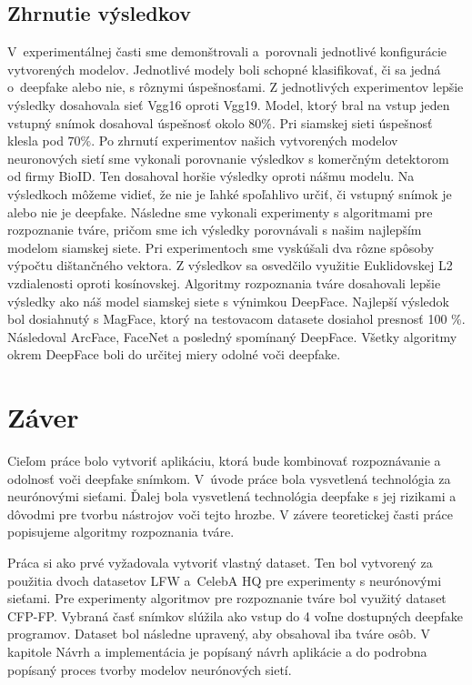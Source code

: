 \newpage

\section{Zhrnutie výsledkov}
V~experimentálnej časti sme demonštrovali a~porovnali jednotlivé konfigurácie vytvorených modelov. Jednotlivé modely boli schopné klasifikovať, či sa jedná o~deepfake alebo nie, s rôznymi úspešnosťami. Z jednotlivých experimentov lepšie výsledky dosahovala sieť Vgg16 oproti Vgg19. Model, ktorý bral na vstup jeden vstupný snímok dosahoval úspešnosť okolo $80 \%$. Pri siamskej sieti úspešnosť klesla pod $70 \%$. Po zhrnutí experimentov našich vytvorených modelov neuronových sietí sme vykonali porovnanie výsledkov s komerčným detektorom od firmy BioID. Ten dosahoval horšie výsledky oproti nášmu modelu. Na výsledkoch môžeme vidieť, že nie je ľahké spoľahlivo určiť, či vstupný snímok je alebo nie je deepfake. Následne sme vykonali experimenty s algoritmami pre rozpoznanie tváre, pričom sme ich výsledky porovnávali s našim najlepším modelom siamskej siete. Pri experimentoch sme vyskúšali dva rôzne spôsoby výpočtu dištančného vektora. Z výsledkov sa osvedčilo využitie Euklidovskej L2 vzdialenosti oproti kosínovskej. Algoritmy rozpoznania tváre dosahovali lepšie výsledky ako náš model siamskej siete s výnimkou DeepFace. Najlepší výsledok bol dosiahnutý s MagFace, ktorý na testovacom datasete dosiahol presnosť 100 \%. Následoval ArcFace, FaceNet a posledný spomínaný DeepFace. Všetky algoritmy okrem DeepFace boli do určitej miery odolné voči deepfake. 

\chapter{Záver}
Cieľom práce bolo vytvoriť aplikáciu, ktorá bude kombinovať rozpoznávanie a odolnosť voči deepfake snímkom. V~úvode práce bola vysvetlená technológia za neurónovými sieťami. Ďalej bola vysvetlená technológia deepfake s jej rizikami a dôvodmi pre tvorbu nástrojov voči tejto hrozbe. V závere teoretickej časti práce popisujeme algoritmy rozpoznania tváre.

Práca si ako prvé vyžadovala vytvoriť vlastný dataset. Ten bol vytvorený za použitia dvoch datasetov LFW a~CelebA HQ pre experimenty s neurónovými sieťami. Pre experimenty algoritmov pre rozpoznanie tváre bol využitý dataset CFP-FP. Vybraná časť snímkov slúžila ako vstup do 4 voľne dostupných deepfake programov. Dataset bol následne upravený, aby obsahoval iba tváre osôb. V kapitole Návrh a implementácia je popísaný návrh aplikácie a do podrobna popísaný proces tvorby modelov neurónových sietí. 

